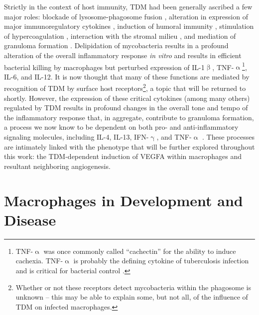 Strictly in the context of host immunity, TDM had been generally ascribed a few major roles: blockade of lysosome\hyp{}phagosome fusion \citep{Indrigo2003, Patin2017b, Axelrod2008}, alteration in expression of major immunoregulatory cytokines \citep{Indrigo2002, Bowdish2009, Perez2000, Sakamoto2013}, induction of humoral immunity \citep{Ryll2001, Fujiwara1999, Fujita2005}, stimulation of hypercoagulation \citep{Donnachie2016, Retzinger1982, Retzinger1987}, interaction with the stromal milieu \citep{Sakamoto2010}, and mediation of granuloma formation \citep{Bekierkunst1968, Hunter2006b, Lee2012}. Delipidation of mycobacteria results in a profound alteration of the overall inflammatory response \textit{in vitro} and results in efficient bacterial killing by macrophages but perturbed expression of IL\hyp{}1$\upbeta$, TNF\hyp{}$\upalpha$\footnote{TNF\hyp{}$\upalpha$ was once commonly called ``cachectin'' for the ability to induce cachexia. TNF\hyp{}$\upalpha$ is probably the defining cytokine of tuberculosis infection and is critical for bacterial control \citep{Orme1998}.}, IL\hyp{}6, and IL\hyp{}12. It is now thought that many of these functions are mediated by recognition of TDM by surface host receptors\footnote{Whether or not these receptors detect mycobacteria within the phagosome is unknown -- this may be able to explain some, but not all, of the influence of TDM on infected macrophages.}, a topic that will be returned to shortly. However, the expression of these critical cytokines (among many others) regulated by TDM results in profound changes in the overall tone and tempo of the inflammatory response that, in aggregate, contribute to granuloma formation, a process we now know to be dependent on both pro\hyp{} and anti\hyp{}inflammatory signaling molecules, including IL\hyp{}4, IL\hyp{}13, IFN\hyp{}$\upgamma$, and TNF\hyp{}$\upalpha$ \citep{Cronan2021, Cavalcanti2012, Flynn1993, Cooper1993, Kaneko1999, Bergeron1997, Akdis2011}. These processes are intimately linked with the phenotype that will be further explored throughout this work: the TDM\hyp{}dependent induction of VEGFA within macrophages and resultant neighboring angiogenesis.

\section{Macrophages in Development and Disease}\label{macrophages}

